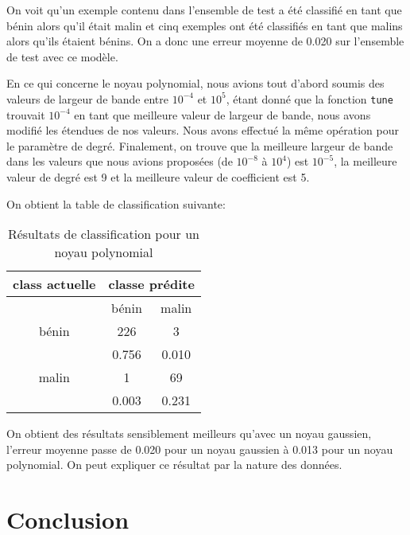 \documentclass{article}
\begin{document}
\begin{multicols}{2}
On voit qu'un exemple contenu dans l'ensemble de test a été classifié en tant
que bénin alors qu'il était malin et cinq exemples ont été classifiés en tant
que malins alors qu'ils étaient bénins. On a donc une erreur moyenne de
0.020 sur l'ensemble de test avec ce modèle.

En ce qui concerne le noyau polynomial, nous avions tout d'abord soumis des 
valeurs de largeur de bande entre $10^{-4}$ et $10^5$, étant donné que la
fonction \texttt{tune} trouvait $10^{-4}$ en tant que meilleure valeur de
largeur de bande, nous avons modifié les étendues de nos valeurs. Nous avons
effectué la même opération pour le paramètre de degré. Finalement, on trouve que
la meilleure largeur de bande dans les valeurs que nous avions proposées (de
$10^{-8}$ à $10^4$) est $10^{-5}$, la meilleure valeur de degré est 9 et la
meilleure valeur de coefficient est 5.

On obtient la table de classification suivante:

\begin{table}[H]
    \begin{center}
        \centering
        \captionsetup{justification=centering}
        \caption{\label{tab:polyEx4}Résultats de classification pour un noyau
        polynomial}
        \begin{tabular}{|c|c|c|}
            \hline
            class actuelle & \multicolumn{2}{|c|}{classe prédite} \\
            \hline
                           & bénin & malin \\
            \hline
            bénin & 226 & 3 \\
                   & 0.756 & 0.010 \\
            \hline
            malin & 1 & 69 \\
                  & 0.003 & 0.231 \\
            \hline
        \end{tabular}
    \end{center}
\end{table}

On obtient des résultats sensiblement meilleurs qu'avec un noyau gaussien,
l'erreur moyenne passe de 0.020 pour un noyau gaussien à 0.013 pour un noyau
polynomial. On peut expliquer ce résultat par la nature des données.


\section{Conclusion}\label{sec:conclu}


\end{multicols}
\end{document}
